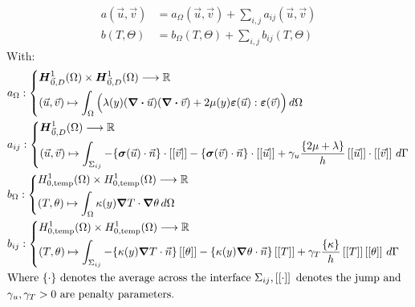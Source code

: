 \documentclass[a4paper,12pt,twoside]{report}
\newcommand{\mtr}{\mathbb{R}}
\begin{document}
\begin{align*}
a(\vec u,\vec v) &= a_\Omega(\vec u,\vec v) + \sum_{i,j} a_{ij}(\vec u,\vec v) \\
b(T,\Theta) &= b_\Omega(T,\Theta) + \sum_{i,j} b_{ij}(T,\Theta)
\end{align*}
With: 
\begin{equation*}
	\begin{aligned}
	& a_\Omega : \left\{
		\begin{aligned}
			& \boldsymbol{H}^1_{\vec 0,D}(\Omega) \times \boldsymbol{H}^1_{\vec 0,D}(\Omega) \longrightarrow \mtr \\
			& (\vec u, \vec v) \mapsto \int_{\Omega} \Big( \lambda(y) (\div \vec u) (\div \vec v) + 2\mu(y) \boldsymbol{\varepsilon}(\vec u) : \boldsymbol{\varepsilon}(\vec v) \Big) \, d\Omega 
		\end{aligned}
	\right. \\
	& a_{ij} : \left\{
		\begin{aligned}
			& \boldsymbol{H}^1_{\vec 0,D}(\Omega) \longrightarrow \mtr \\ 
			& (\vec u, \vec v) \mapsto \int_{\Sigma_{ij}} - \{\boldsymbol{\sigma}(\vec u) \cdot \vec n\} \cdot \left[\left[ \vec v \right]\right] - \{\boldsymbol{\sigma}(\vec v) \cdot \vec n\} \cdot \left[\left[ \vec u \right]\right] + \gamma_u \frac{\{2 \mu + \lambda\}}{h} \left[\left[ \vec u \right]\right] \cdot \left[\left[ \vec v \right]\right] \, d\Gamma
		\end{aligned}
	\right.\\
	& b_\Omega : \left\{
		\begin{aligned}
			& H^1_{0,\text{temp}}(\Omega) \times H^1_{0,\text{temp}}(\Omega) \longrightarrow \mtr \\
			& (T, \theta) \mapsto \int_{\Omega} \kappa(y) \grad T \cdot \grad \theta \, d\Omega 
		\end{aligned}
	\right. \\
	& b_{ij} : \left\{
		\begin{aligned}
			& H^1_{0,\text{temp}}(\Omega) \times H^1_{0,\text{temp}}(\Omega) \longrightarrow \mtr \\
			& (T, \theta) \mapsto \int_{\Sigma_{ij}} - \{ \kappa(y) \grad T \cdot \vec n \} \left[\left[ \theta \right]\right] - \{ \kappa(y) \grad \theta \cdot \vec n \}  \left[\left[ T \right]\right] + \gamma_T \frac{\{ \kappa \}}{h} \left[\left[ T \right]\right]\left[\left[ \theta \right]\right] \, d\Gamma
		\end{aligned}
	\right. \\
	& \text{Where } \{ \cdot \} \text{ denotes the average across the interface } \Sigma_{ij}, \left[\left[\cdot\right]\right] \text{ denotes the jump and } \\
	& \gamma_u, \gamma_T > 0 \text{ are penalty parameters.} 
	\end{aligned}
\end{equation*}
\end{document}
